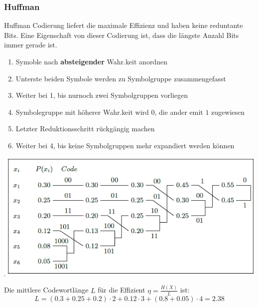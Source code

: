 \subsubsection{Huffman}
Huffman Codierung liefert die maximale Effizienz und haben keine reduntante Bits. Eine Eigenschaft von dieser Codierung ist, dass die längste Anzahl Bits immer gerade ist.
\begin{enumerate}[nosep]
	\item Symoble nach \textbf{absteigender} Wahr.keit anordnen
	\item Unterste beiden Symbole werden zu Symbolgruppe zusammengefasst
	\item Weiter bei 1, bis nurnoch zwei Symbolgruppen vorliegen
	\item Symbolegruppe mit höherer Wahr.keit wird $0$, die ander emit $1$ zugewiesen
	\item Letzter Reduktionsschritt rückgängig machen
	\item Weiter bei 4, bis keine Symbolgruppen mehr expandiert werden können
\end{enumerate}
\begin{center}
	\includegraphics[width=\columnwidth]{Images/huffman}
\end{center}
Die mittlere Codewortlänge $L$ für die Effizient $\eta = \frac{H(X)}{L}$ ist:
\[
L = (0.3+0.25+0.2)\cdot2 + 0.12\cdot 3 + (0.8+0.05)\cdot 4 = 2.38
\]
